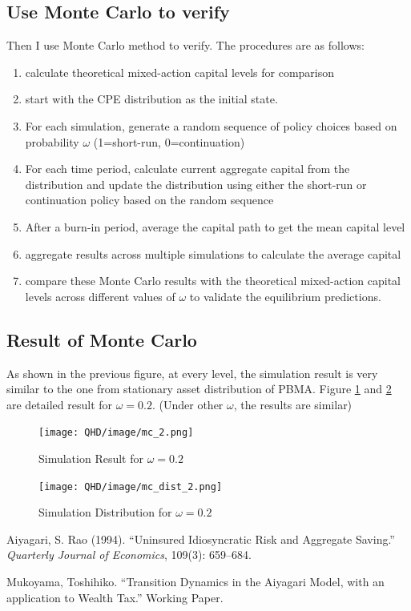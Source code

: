 \documentclass[11pt,a4paper]{article}
\begin{document}
\subsection{Use Monte Carlo to verify}

Then I use Monte Carlo method to verify. The procedures are as follows:
\begin{enumerate}
    \item calculate theoretical mixed-action capital levels for comparison
    \item start with the CPE distribution as the initial state.
    \item For each simulation, generate a random sequence of policy choices based on probability $\omega$ (1=short-run, 0=continuation)
    \item For each time period,  calculate current aggregate capital from the distribution and
update the distribution using either the short-run or continuation policy based on the random sequence
    \item After a burn-in period, average the capital path to get the mean capital level
    \item aggregate results across multiple simulations to calculate the average capital 
    \item compare these Monte Carlo results with the theoretical mixed-action capital levels across different values of $\omega$ to validate the equilibrium predictions.
\end{enumerate}


\subsection{Result of Monte Carlo}

As shown in the previous figure, at every level, the simulation result is very similar to the one from stationary asset distribution of PBMA. Figure \ref{fig:Simulation} and \ref{fig:simulation_distribution} are detailed result for $\omega=0.2$. (Under other $\omega$, the results are similar)
\begin{figure}[h!]
    \centering
    \texttt{[image: QHD/image/mc\_2.png]}
    \caption{Simulation Result for $\omega=0.2$}
    \label{fig:Simulation}
\end{figure}

\begin{figure}[h!]
    \centering
    \texttt{[image: QHD/image/mc\_dist\_2.png]}
    \caption{Simulation Distribution for $\omega=0.2$}
    \label{fig:simulation_distribution}
\end{figure}


\newpage


\begin{thebibliography}{9}

Aiyagari, S. Rao (1994).
\newblock ``Uninsured Idiosyncratic Risk and Aggregate Saving.''
\newblock \textit{Quarterly Journal of Economics}, 109(3): 659--684.

Mukoyama, Toshihiko.
\newblock ``Transition Dynamics in the Aiyagari Model, with an application to Wealth Tax.''
\newblock Working Paper.

\end{thebibliography}
\end{document}

